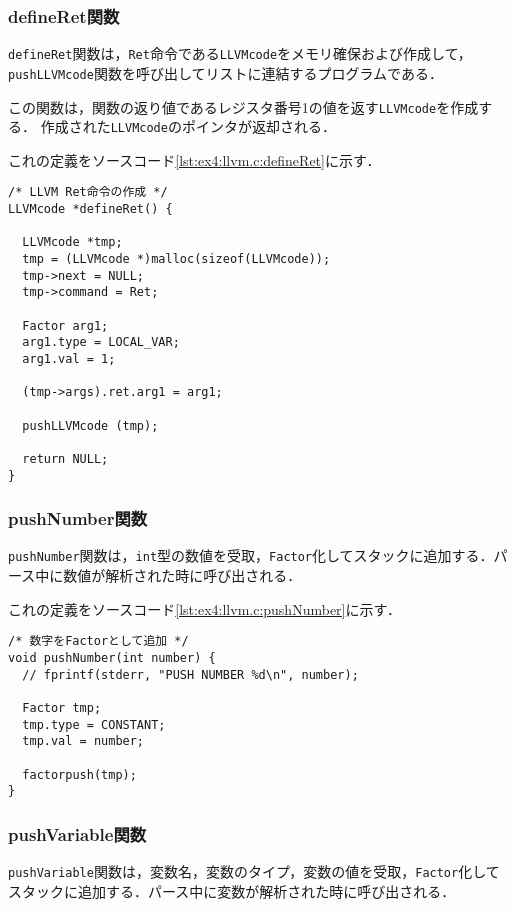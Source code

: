 \documentclass[uplatex]{jsarticle}
\begin{document}
\subsubsection{defineRet関数}
\verb#defineRet#関数は，\verb#Ret#命令である\verb#LLVMcode#をメモリ確保および作成して，\verb#pushLLVMcode#関数を呼び出してリストに連結するプログラムである．

この関数は，関数の返り値であるレジスタ番号1の値を返す\verb#LLVMcode#を作成する．
作成された\verb#LLVMcode#のポインタが返却される．

これの定義をソースコード\ref{lst:ex4:llvm.c:defineRet}に示す．

\begin{lstlisting}[caption=defineRet関数の定義,label=lst:ex4:llvm.c:defineRet]
/* LLVM Ret命令の作成 */
LLVMcode *defineRet() {

  LLVMcode *tmp;
  tmp = (LLVMcode *)malloc(sizeof(LLVMcode));
  tmp->next = NULL;
  tmp->command = Ret;

  Factor arg1;
  arg1.type = LOCAL_VAR;
  arg1.val = 1;

  (tmp->args).ret.arg1 = arg1;

  pushLLVMcode (tmp);

  return NULL;
}
\end{lstlisting}

\subsubsection{pushNumber関数}
\verb#pushNumber#関数は，\verb#int#型の数値を受取，\verb#Factor#化してスタックに追加する．パース中に数値が解析された時に呼び出される．

これの定義をソースコード\ref{lst:ex4:llvm.c:pushNumber}に示す．

\begin{lstlisting}[caption=pushNumber関数の定義,label=lst:ex4:llvm.c:pushNumber]
/* 数字をFactorとして追加 */
void pushNumber(int number) {
  // fprintf(stderr, "PUSH NUMBER %d\n", number);

  Factor tmp;
  tmp.type = CONSTANT;
  tmp.val = number;

  factorpush(tmp);
}
\end{lstlisting}


\subsubsection{pushVariable関数}
\verb#pushVariable#関数は，変数名，変数のタイプ，変数の値を受取，\verb#Factor#化してスタックに追加する．パース中に変数が解析された時に呼び出される．
\end{document}
